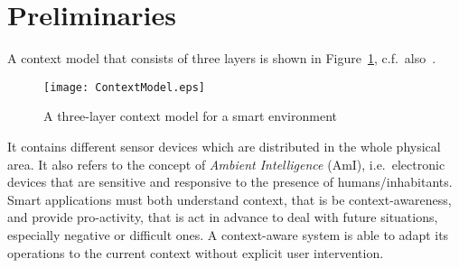 \documentclass[runningheads,a4paper]{llncs}
\begin{document}
\section{Preliminaries}
\label{sec:preliminaries}

A context model that consists of three layers is shown in Figure~\ref{fig:context-aware-systems},
c.f.\ also~\cite{Klimek-Kotulski-2014-IE-AITAmI}.
\begin{figure}[htb]
\centering
{}
\texttt{[image: ContextModel.eps]}
\caption{A three-layer context model for a smart environment}
\label{fig:context-aware-systems}
\end{figure}
It contains different sensor devices which are distributed in the whole physical area.
It also refers to the concept of \emph{Ambient Intelligence} (AmI),
i.e.\ electronic devices that are sensitive and responsive to the presence of
humans/inhabitants.
Smart applications must both understand context, that is be context-awareness,
and provide pro-activity,
that is act in advance to deal with future situations,
especially negative or difficult ones.
A context-aware system is able to adapt its operations to
the current context without explicit user intervention.
\end{document}

